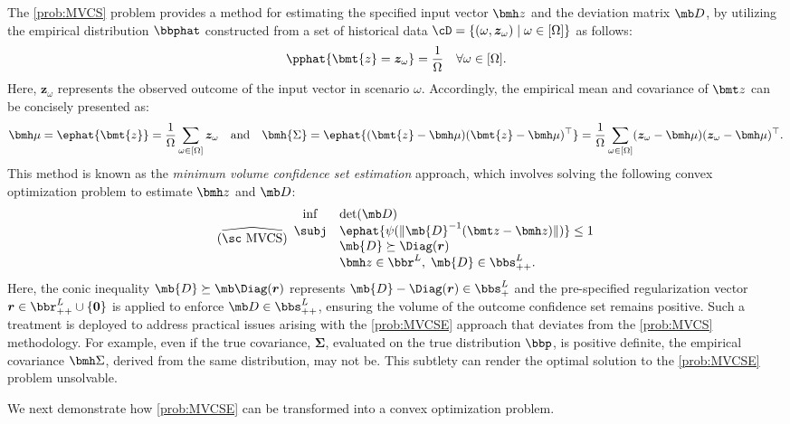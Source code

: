 \documentclass[mnsc, nonblindrev]{informswp}
\newcommand{\1}[1]{\mathds{1}{\left(#1\right)}}
\begin{document}
The \ref{prob:MVCS} problem provides a method for estimating the specified input vector $\bmh z$ and the deviation matrix $\mb D$, by utilizing the empirical distribution $\bbphat$ constructed from a set of historical data $\cD = \{(\omega,{\bm z}_\omega) \;|\; \omega \in [\Omega] \}$ as follows:
$$
\pphat{\bmt{ z} = {\bm z}_\omega} = \frac{1}{\Omega} ~~~\forall \omega \in [\Omega].
$$
Here, ${\bm z}_\omega$ represents the observed outcome of the input vector in scenario $\omega$. Accordingly, the empirical mean and covariance of $\bmt z$ can be concisely presented as:
\[
\bmh \mu = \ephat{\bmt {z}} = \frac{1}{\Omega} \sum_{\omega \in [\Omega]} \bm{z}_\omega 
~~~\text{and}~~~
\bmh{\Sigma} = \ephat{(\bmt{z} - \bmh \mu)(\bmt{z} - \bmh \mu)^\top} = 
\frac{1}{\Omega} \sum_{\omega \in [\Omega]} (\bm{z}_\omega - \bmh \mu)(\bm{z}_\omega - \bmh \mu)^\top.
\]
This method is known as the \textit{minimum volume confidence set estimation} approach, which involves solving the following convex optimization problem to estimate $\bmh z$ and $\mb D$:
\begin{equation}
\label{prob:MVCSE}
\tag{$\widehat{\text{\sc MVCS}}$}
\begin{array}{cll}
\inf & \displaystyle\det(\mb D) \\
\subj & \displaystyle\ephat{\psi(\|\mb{D}^{-1}( \bmt z - \bmh z )\|)} \leq 1 \\
& \mb{D} \succeq \Diag(\bm r) \\
& \bmh z \in \bbr^L, \; \mb{D} \in \bbs^{L}_{++}.
\end{array} 
\end{equation}
Here, the conic inequality $\mb{D} \succeq \mb \Diag(\bm r)$ represents $\mb{D} - \Diag(\bm r)\in \bbs^L_+$ and the pre-specified regularization vector $\bm r\in \bbr^L_{++} \cup\{\bm 0\}$ is applied to enforce $\mb D \in \bbs^L_{++}$, ensuring the volume of the outcome confidence set remains positive. Such a treatment is deployed to address practical issues arising with the \ref{prob:MVCSE} approach that deviates from the \ref{prob:MVCS} methodology. For example, even if the true covariance, $\bm \Sigma$, evaluated on the true distribution $\bbp$, is positive definite, the empirical covariance $\bmh \Sigma$, derived from the same distribution, may not be. This subtlety can render the optimal solution to the \ref{prob:MVCSE} problem unsolvable. 

We next demonstrate how \ref{prob:MVCSE} can be transformed into a convex optimization problem. 
\end{document}
